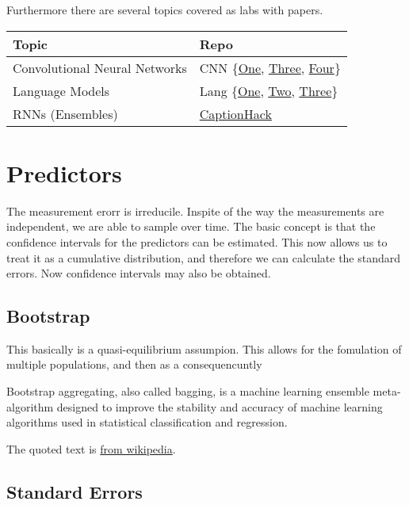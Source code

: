 \documentclass[12pt,a4paper,oneside,headinclude]{scrartcl}
\numberwithin{figure}{section}
\numberwithin{equation}{section}
\numberwithin{table}{section}
\renewenvironment{quote}{\begin{customblockquote}\list{}{\rightmargin=0em\leftmargin=0em}%
\item\relax\color{blockquote-text}\ignorespaces}{\unskip\unskip\endlist\end{customblockquote}}
\begin{document}
Furthermore there are several topics covered as labs with papers.

\begin{center}
\begin{tabular}{ll}
Topic & Repo\\
\hline
Convolutional Neural Networks & CNN \{\href{https://github.com/univai-summerschool-2019/CNN1}{One}, \href{https://github.com/univai-summerschool-2019/CNN3}{Three}, \href{https://github.com/univai-summerschool-2019/CNN4}{Four}\}\\
Language Models & Lang \{\href{https://github.com/univai-summerschool-2019/Lang1}{One}, \href{https://github.com/univai-summerschool-2019/Lang2}{Two}, \href{https://github.com/univai-summerschool-2019/Lang3}{Three}\}\\
RNNs  (Ensembles) & \href{https://github.com/univai-summerschool-2019/CaptionHack}{CaptionHack}\\
\end{tabular}
\end{center}

\section{Predictors}
\label{sec:orgdf81ab2}
The measurement erorr is irreducile. Inspite of the way the measurements are
independent, we are able to sample over time. The basic concept is that the
confidence intervals for the predictors can be estimated. This now allows us to
treat it as a cumulative distribution, and therefore we can calculate the
standard errors. Now confidence intervals may also be obtained.
\subsection{Bootstrap}
\label{sec:orgac02bb8}
This basically is a quasi-equilibrium assumpion. This allows for the fomulation
of multiple populations, and then as a consequencuntly
\begin{quote}
Bootstrap aggregating, also called bagging, is a machine learning ensemble
meta-algorithm designed to improve the stability and accuracy of machine
learning algorithms used in statistical classification and regression.
\end{quote}
The quoted text is \href{https://en.wikipedia.org/wiki/Bootstrap\_aggregating}{from wikipedia}.
\subsection{Standard Errors}
\label{sec:org3562c0a}
\end{document}
